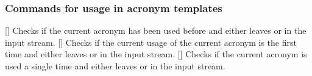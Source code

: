 \documentclass{acro-manual}
\begin{document}
\subsubsection{Commands for usage in acronym templates}
\begin{commands}
  \expandable{}[]
    Checks if the current acronym has been used before and either leaves
     or  in the input stream.
  []
    Checks if the current usage of the current acronym is the first time and
    either leaves  or  in the input stream.
  []
    Checks if the current acronym is used a single time and either leaves
     or  in the input stream.
\end{commands}
\end{document}

